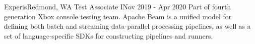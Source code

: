 \resumeSubheading
{Experis}{Redmond, WA}
{Test Associate I}{Nov 2019 - Apr 2020}
    \resumeItemListStart
          {Part of fourth generation Xbox console testing team.}
          {Apache Beam is a unified model for defining both batch and streaming data-parallel processing pipelines, as well as a set of language-specific SDKs for constructing pipelines and runners.}
    \resumeItemListEnd